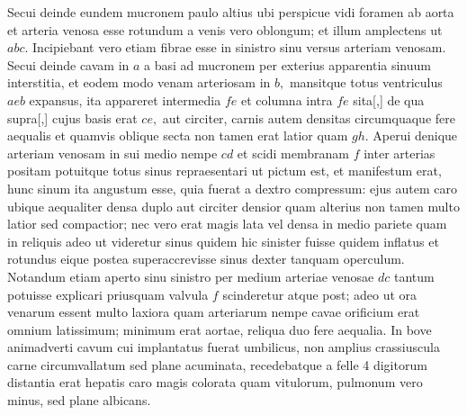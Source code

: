 Secui deinde eundem mucronem paulo altius ubi perspicue vidi foramen ab aorta et arteria venosa esse rotundum a venis vero oblongum; et illum amplectens ut $abc.$ Incipiebant vero etiam fibrae esse in sinistro sinu versus arteriam venosam.
Secui deinde cavam in $a$ a basi ad mucronem per exterius apparentia sinuum interstitia, et eodem modo venam arteriosam in $b,$ mansitque totus ventriculus $aeb$ expansus, ita  appareret intermedia $fe$ et columna intra $fe$ sita[,]
de qua supra[,] cujus basis erat $ce,$  aut circiter, carnis autem densitas circumquaque fere aequalis et quamvis oblique secta non tamen erat latior quam
$gh.$ Aperui denique arteriam venosam in sui medio nempe $cd$ et scidi membranam $f$ inter arterias positam potuitque totus sinus repraesentari ut pictum est, et manifestum erat, hunc sinum ita angustum esse, quia fuerat a dextro compressum: ejus autem caro ubique aequaliter densa duplo aut circiter densior quam alterius non tamen multo latior sed compactior; nec vero erat magis lata vel densa in medio pariete quam in reliquis adeo ut videretur sinus quidem hic sinister fuisse quidem inflatus et rotundus eique postea superaccrevisse sinus dexter tanquam operculum. Notandum etiam aperto sinu sinistro per medium arteriae venosae $dc$ tantum potuisse explicari priusquam valvula $f$ scinderetur atque post; adeo ut ora venarum essent multo laxiora quam arteriarum nempe cavae orificium erat omnium latissimum; minimum erat aortae, reliqua duo fere aequalia.
\pend%
\vspace{1.0em}%
\pstart%
\noindent%
In bove animadverti cavum cui implantatus fuerat umbilicus, non amplius crassiuscula carne circumvallatum sed plane acuminata, recedebatque a felle 4 digitorum distantia erat hepatis caro magis colorata quam vitulorum, pulmonum vero minus, sed plane albicans.
\pend
\pstart
